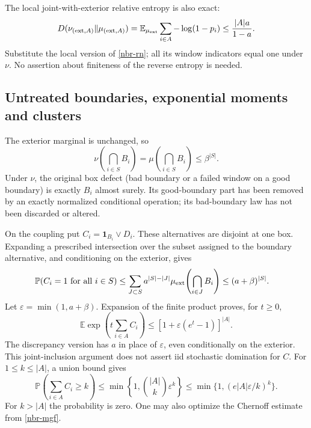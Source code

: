 The local joint-with-exterior relative entropy is also exact:
\begin{equation}
 D(\nu_{({\rm ext},A)}\|\mu_{({\rm ext},A)})
 =\mathbb E_{\mu_{\rm ext}}\sum_{i\in A}-\log(1-p_i)
 \le\frac{|A|a}{1-a}.
 \label{nbr-entropy}
\end{equation}
Substitute the local version of \eqref{nbr-rn}; all its window
indicators equal one under \(\nu\). No assertion about finiteness of
the reverse entropy is needed.

\subsection{Untreated boundaries, exponential moments and clusters}
\label{nbr-sparsity-section}

The exterior marginal is unchanged, so
\begin{equation}
 \nu\!\left(\bigcap_{i\in S}B_i\right)
 =\mu\!\left(\bigcap_{i\in S}B_i\right)\le\beta^{|S|}.
 \label{nbr-retained-boundaries}
\end{equation}
Under \(\nu\), the original box defect (bad boundary or a failed window
on a good boundary) is exactly \(B_i\) almost surely. Its good-boundary
part has been removed by an exactly normalized conditional operation;
its bad-boundary law has not been discarded or altered.

On the coupling put \(C_i=\mathbf1_{B_i}\lor D_i\). These alternatives
are disjoint at one box. Expanding a prescribed intersection over the
subset assigned to the boundary alternative, and conditioning on the
exterior, gives
\begin{align}
 \mathbb P(C_i=1\text{ for all }i\in S)
 &\le\sum_{J\subset S}a^{|S|-|J|}
       \mu_{\rm ext}\!\left(\bigcap_{i\in J}B_i\right)
 \le(a+\beta)^{|S|}.
 \label{nbr-combined-joint}
\end{align}
Let \(\varepsilon=\min(1,a+\beta)\).
Expansion of the finite product proves, for \(t\ge0\),
\begin{equation}
 \mathbb E\exp\left(t\sum_{i\in A}C_i\right)
 \le[1+\varepsilon(e^t-1)]^{|A|}.
 \label{nbr-mgf}
\end{equation}
The discrepancy version has \(a\) in place of \(\varepsilon\), even
conditionally on the exterior. This joint-inclusion argument does not
assert iid stochastic domination for \(C\).
For \(1\le k\le|A|\), a union bound gives
\begin{equation}
 \mathbb P\!\left(\sum_{i\in A}C_i\ge k\right)
 \le\min\left\{1,\binom{|A|}{k}\varepsilon^k\right\}
 \le\min\{1,(e|A|\varepsilon/k)^k\}.
 \label{nbr-count-tail}
\end{equation}
For \(k>|A|\) the probability is zero. One may also optimize the
Chernoff estimate from \eqref{nbr-mgf}.

